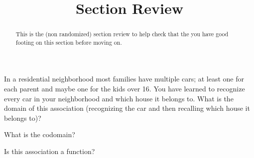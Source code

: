 \documentclass{ximeraXloud}
\title{Section Review}
\begin{document}
\begin{abstract}
This is the (non randomized) section review to help check that the you have good footing on this section before moving on.
\end{abstract}

\maketitle




\begin{problem}
    In a residential neighborhood most families have multiple cars; at least one for each parent and maybe one for the kids over 16. You have learned to recognize every car in your neighborhood and which house it belongs to. What is the domain of this association (recognizing the car and then recalling which house it belongs to)?
    \begin{multipleChoice}
    \end{multipleChoice}
    \begin{problem}
        What is the codomain?
        \begin{multipleChoice}
        \end{multipleChoice}
        \begin{problem}
            Is this association a function?
            \begin{multipleChoice}
            \end{multipleChoice}
        \end{problem}
    \end{problem}
\end{problem}
\end{document}
